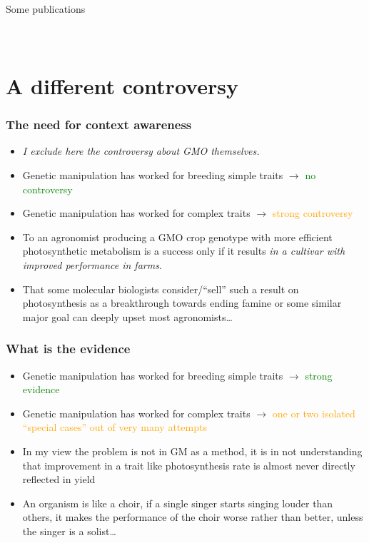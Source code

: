 \documentclass[10pt]{beamer}
\begin{document}
\begin{frame}{Some publications}
   \cite{Aphalo1995}\\
   \cite{Trewavas2014}\\
   \cite{Taiz2019}\\
   \cite{Aphalo2021a}
\end{frame}

\section{A different controversy}

\begin{frame}
\frametitle{The need for context awareness}
\begin{itemize}
\item \emph{I exclude here the controversy about GMO themselves.}
\item Genetic manipulation has worked for breeding simple traits $\rightarrow$ \textcolor{green}{no controversy}
\item Genetic manipulation has worked for complex traits $\rightarrow$ \textcolor{orange}{strong controversy}
\item To an agronomist producing a GMO crop genotype with more efficient photosynthetic metabolism is a success only if it results \emph{in a cultivar with improved performance in farms}.
\item That some molecular biologists consider/``sell'' such a result on photosynthesis as a breakthrough towards ending famine or some similar major goal can deeply upset most agronomists\ldots
\end{itemize}
\end{frame}

\begin{frame}
\frametitle{What is the evidence}
\begin{itemize}
\item Genetic manipulation has worked for breeding simple traits $\rightarrow$ \textcolor{green}{strong evidence}
\item Genetic manipulation has worked for complex traits $\rightarrow$ \textcolor{orange}{one or two isolated ``special cases'' out of very many attempts}
\item In my view the problem is not in GM as a method, it is in not understanding that improvement in a trait like photosynthesis rate is almost never directly reflected in yield
\item An organism is like a choir, if a single singer starts singing louder than others, it makes the performance of the choir worse rather than better, unless the singer is a solist\ldots
\end{itemize}
\end{frame}
\end{document}
